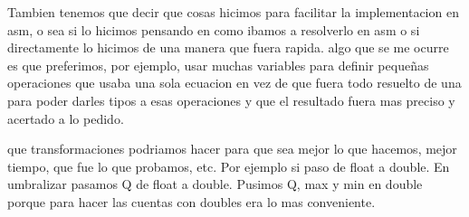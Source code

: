 \documentclass[10pt, a4paper]{article}
\begin{document}
 Tambien tenemos que decir que cosas hicimos para facilitar la implementacion en asm, o sea si lo hicimos pensando en como ibamos a resolverlo en asm o si directamente lo hicimos de una manera que fuera rapida. algo que se me ocurre es que preferimos, por ejemplo, usar muchas variables para definir pequeñas operaciones que usaba una sola ecuacion en vez de que fuera todo resuelto de una para poder darles tipos a esas operaciones y que el resultado fuera mas preciso y acertado a lo pedido.\newline

que transformaciones podriamos hacer para que sea mejor lo que hacemos, mejor tiempo, que fue lo que probamos, etc. Por ejemplo si paso de float a double. En umbralizar pasamos Q de float a double. Pusimos Q, max y min en double porque para hacer las cuentas con doubles era lo mas conveniente.
\newline
\end{document}

